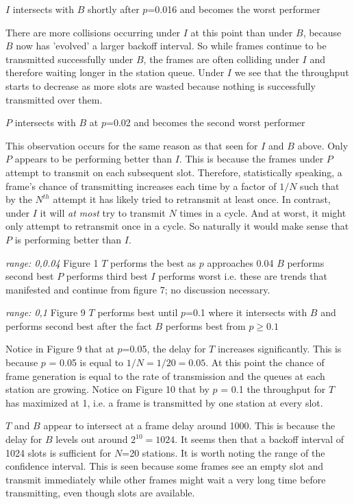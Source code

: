 \documentclass[twocolumn]{article}
\begin{document}
$I$ intersects with $B$ shortly after $p$=0.016 and becomes the worst performer

There are more collisions occurring under $I$ at this point than under $B$, because $B$ now has 'evolved' a larger
backoff interval. So while frames continue to be transmitted successfully under $B$, the frames are often
colliding under $I$ and therefore waiting longer in the station queue. Under $I$ we see that the throughput starts to decrease
as more slots are wasted because nothing is successfully transmitted over them.

$P$ intersects with $B$ at $p$=0.02 and becomes the second worst performer

This observation occurs for the same reason as that seen for $I$ and $B$ above. Only $P$ appears to be performing better than
$I$. This is because the frames under $P$ attempt to transmit on each subsequent slot. Therefore, statistically speaking, a frame's
chance of transmitting increases each time by a factor of $1/N$ such that by the $N^{th}$ attempt it has likely tried to
retransmit at least once. In contrast, under $I$ it will \emph{at most} try to transmit $N$ times in a cycle. And at worst, it might only
attempt to retransmit once in a cycle. So naturally it would make sense that $P$ is performing better than $I$.

\emph{range: 0,0.04} Figure 1
$T$ performs the best as $p$ approaches 0.04
$B$ performs second best
$P$ performs third best
$I$ performs worst
i.e. these are trends that manifested and continue from figure 7; no discussion necessary.

\emph{range: 0,1} Figure 9
$T$ performs best until $p$=0.1 where it intersects with $B$ and performs second best after the fact
$B$ performs best from $p \geq 0.1$

Notice in Figure 9 that at $p$=0.05, the delay for $T$ increases significantly. This is because
$p$ = 0.05 is equal to $1/N = 1/20 = 0.05$. At this point the chance of frame generation is equal to the
rate of transmission and the queues at each station are growing. Notice on Figure 10 that by
$p$ = 0.1 the throughput for $T$ has maximized at 1, i.e. a frame is transmitted by one station at every slot.

$T$ and $B$ appear to intersect at a frame delay around 1000. This is because the delay for $B$ levels out around $2^{10} = 1024$.
It seems then that a backoff interval of 1024 slots is sufficient for $N$=20 stations. It is worth noting the
range of the confidence interval. This is seen because some frames see an empty slot and transmit immediately while
other frames might wait a very long time before transmitting, even though slots are available.
\end{document}
